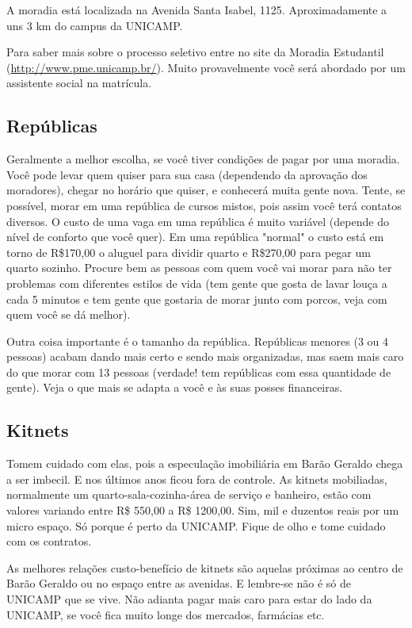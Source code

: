 A moradia está localizada na Avenida Santa Isabel, 1125. Aproximadamente a uns
3 km do campus da UNICAMP.

Para saber mais sobre o processo seletivo entre no site da Moradia Estudantil
(\url{http://www.pme.unicamp.br/}). Muito provavelmente você
será abordado por um assistente social na matrícula.

\subsection{Repúblicas}

Geralmente a melhor escolha, se você tiver condições de pagar por uma moradia.
Você pode levar quem quiser para sua casa (dependendo da aprovação dos
moradores), chegar no horário que quiser, e conhecerá muita gente nova. Tente,
se possível, morar em uma república de cursos mistos, pois assim você terá
contatos diversos. O custo de uma vaga em uma república é muito variável
(depende do nível de conforto que você quer). Em uma república "normal" o custo
está em torno de R\$170,00 o aluguel para dividir quarto e R\$270,00 para pegar
um quarto sozinho. Procure bem as pessoas com quem você vai morar para não ter
problemas com diferentes estilos de vida (tem gente que gosta de lavar louça
a cada 5 minutos e tem gente que gostaria de morar junto com porcos, veja com
quem você se dá melhor).

Outra coisa importante é o tamanho da república. Repúblicas menores (3 ou
4 pessoas) acabam dando mais certo e sendo mais organizadas, mas saem mais caro
do que morar com 13 pessoas (verdade! tem repúblicas com essa quantidade de
gente). Veja o que mais se adapta a você e às suas posses financeiras.

\subsection{Kitnets}

Tomem cuidado com elas, pois a especulação imobiliária em Barão Geraldo chega
a ser imbecil. E nos últimos anos ficou fora de controle. As kitnets mobiliadas,
normalmente um quarto-sala-cozinha-área de serviço e banheiro, estão com valores
variando entre R\$ 550,00 a R\$ 1200,00. Sim, mil e duzentos reais por um micro
espaço. Só porque é perto da UNICAMP. Fique de olho e tome cuidado com os
contratos.

As melhores relações custo-benefício de kitnets são aquelas próximas ao centro
de Barão Geraldo ou no espaço entre as avenidas. E lembre-se não é só de UNICAMP
que se vive. Não adianta pagar mais caro para estar do lado da UNICAMP, se você
fica muito longe dos mercados, farmácias etc.

